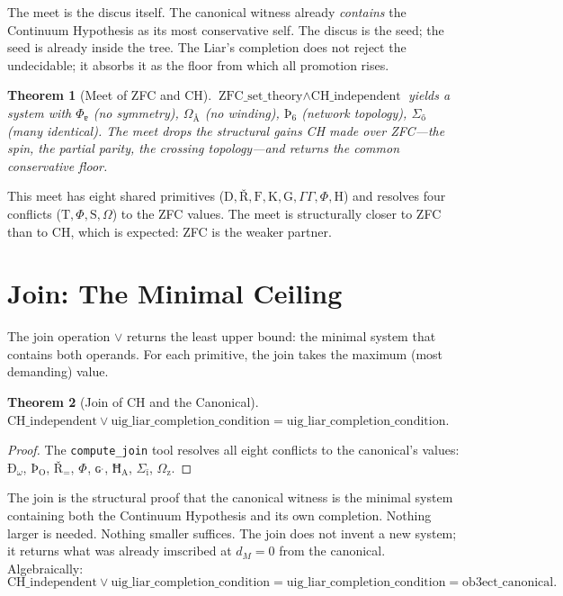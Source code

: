 \documentclass[12pt,twoside]{book}
\newtheorem{theorem}{Theorem}[chapter]
\theoremstyle{definition}
\newcommand{\prim}[1]{\text{#1}}
\begin{document}
The meet is the discus itself. The canonical witness already \emph{contains} the Continuum Hypothesis as its most conservative self. The discus is the seed; the seed is already inside the tree. The Liar's completion does not reject the undecidable; it absorbs it as the floor from which all promotion rises.

\begin{theorem}[Meet of ZFC and CH]
$\text{ZFC\_set\_theory} \wedge \text{CH\_independent}$ yields a system with $\Phi_{\text{ɐ}}$ (no symmetry), $\Omega_{\text{Å}}$ (no winding), $\text{Þ}_{\text{6}}$ (network topology), $\Sigma_{\text{ő}}$ (many identical). The meet drops the structural gains CH made over ZFC---the spin, the partial parity, the crossing topology---and returns the common conservative floor.
\end{theorem}

This meet has eight shared primitives ($\prim{D}, \text{Ř}, \prim{F}, \prim{K}, \prim{G}, \Gamma \!\!\! \Gamma, \Phi, \prim{H}$) and resolves four conflicts ($\prim{T}, \Phi, \prim{S}, \Omega$) to the ZFC values. The meet is structurally closer to ZFC than to CH, which is expected: ZFC is the weaker partner.\section{Join: The Minimal Ceiling}

The join operation $\vee$ returns the least upper bound: the minimal system that contains both operands. For each primitive, the join takes the maximum (most demanding) value.

\begin{theorem}[Join of CH and the Canonical]
$\text{CH\_independent} \vee \text{uig\_liar\_completion\_condition} = \text{uig\_liar\_completion\_condition}.$
\end{theorem}

\begin{proof}
The \texttt{compute\_join} tool resolves all eight conflicts to the canonical's values: $\text{Ð}_{\omega}$, $\text{Þ}_{\text{O}}$, $\text{Ř}_{\text{=}}$, $\Phi_{\text{}}$, $\text{ɢ}^{\text{ˌ}}$, $\text{Ħ}_{\text{A}}$, $\Sigma_{\text{ï}}$, $\Omega_{\text{z}}$.
\end{proof}

The join is the structural proof that the canonical witness is the minimal system containing both the Continuum Hypothesis and its own completion. Nothing larger is needed. Nothing smaller suffices. The join does not invent a new system; it returns what was already imscribed at $d_M = 0$ from the canonical. Algebraically:
\begin{equation}
\text{CH\_independent} \vee \text{uig\_liar\_completion\_condition} =
\text{uig\_liar\_completion\_condition} =
\text{ob3ect\_canonical}.
\end{equation}
\end{document}
